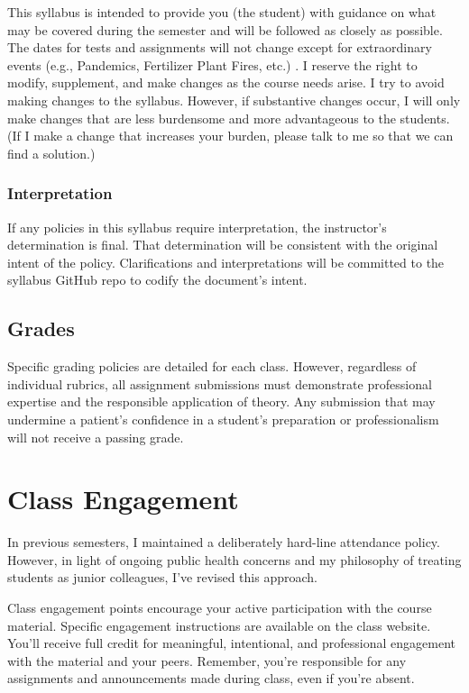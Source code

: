 \documentclass[
]{book}
\begin{document}
This syllabus is intended to provide you (the student) with guidance on what may be covered during the semester and will be followed as closely as possible. The dates for tests and assignments will not change except for extraordinary events (e.g., Pandemics, Fertilizer Plant Fires, etc.)
. I reserve the right to modify, supplement, and make changes as the course needs arise. I try to avoid making changes to the syllabus. However, if substantive changes occur, I will only make changes that are less burdensome and more advantageous to the students. (If I make a change that increases your burden, please talk to me so that we can find a solution.)

\subsection{Interpretation}\label{interpretation}

If any policies in this syllabus require interpretation, the instructor's determination is final. That determination will be consistent with the original intent of the policy. Clarifications and interpretations will be committed to the syllabus GitHub repo to codify the document's intent.

\section{Grades}\label{grades}

Specific grading policies are detailed for each class. However, regardless of individual rubrics, all assignment submissions must demonstrate professional expertise and the responsible application of theory. Any submission that may undermine a patient's confidence in a student's preparation or professionalism will not receive a passing grade.

\chapter{Class Engagement}\label{class-engagement}

In previous semesters, I maintained a deliberately hard-line attendance policy. However, in light of ongoing public health concerns and my philosophy of treating students as junior colleagues, I've revised this approach.

Class engagement points encourage your active participation with the course material. Specific engagement instructions are available on the class website. You'll receive full credit for meaningful, intentional, and professional engagement with the material and your peers. Remember, you're responsible for any assignments and announcements made during class, even if you're absent.
\end{document}
